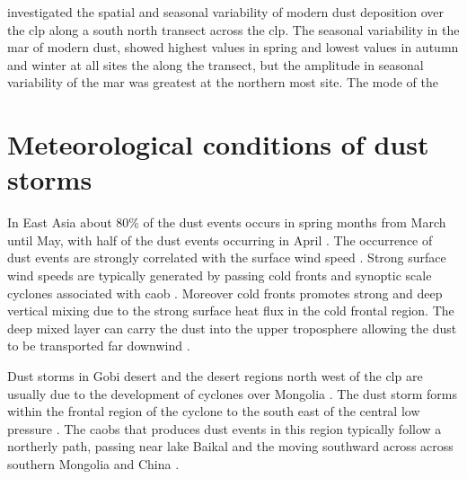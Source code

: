 \textcite{sun2003seasonal} investigated the spatial and seasonal variability of modern dust deposition over the \acrshort{clp} along a south north transect across the \acrshort{clp}. 
The seasonal variability in the \acrshort{mar} of modern dust, showed highest values in spring and lowest values in autumn and winter at all sites the along the transect, but the amplitude in seasonal variability of the \acrshort{mar} was greatest at the northern most site. The mode of the 
\section{Meteorological conditions of dust storms}

In East Asia about 80\% of the dust events occurs in spring months from March until May, with half of the dust events occurring in April \parencite{sun2001spatial}. 
The occurrence of dust events are strongly correlated with the surface wind speed \parencite{kurosaki2003recent}. 
Strong surface wind speeds are typically generated by passing cold fronts and synoptic scale cyclones associated with \acrfull{caob} \parencite{sun2001spatial, zhou2003typical, takemi2005dust}.
Moreover cold fronts promotes strong and deep vertical mixing due to the strong surface heat flux in the cold frontal region. The deep mixed layer can carry the dust into the upper troposphere allowing the dust to be transported far downwind \parencite{liu2003high}. 
  
Dust storms in Gobi desert and the desert regions north west of the \acrshort{clp} are usually due to the development of cyclones over Mongolia \parencite{shao2006review}. 
The dust storm forms within the frontal region of the cyclone to the south east of the central low pressure \parencite{takemi2005dust}. 
The \acrshort{caob}s that produces dust events in this region typically follow a northerly path, passing near lake Baikal and the moving southward across across southern Mongolia and China \parencite{sun2001spatial}. 

